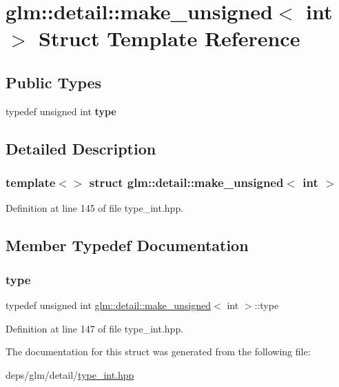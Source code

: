 \hypertarget{structglm_1_1detail_1_1make__unsigned_3_01int_01_4}{}\section{glm\+:\+:detail\+:\+:make\+\_\+unsigned$<$ int $>$ Struct Template Reference}
\label{structglm_1_1detail_1_1make__unsigned_3_01int_01_4}
\subsection*{Public Types}
\begin{DoxyCompactItemize}
\item 
\mbox{\label{structglm_1_1detail_1_1make__unsigned_3_01int_01_4_ac3fd57ed35c0305bbe941009a84139c1}} 
typedef unsigned int {\bfseries type}
\end{DoxyCompactItemize}


\subsection{Detailed Description}
\subsubsection*{template$<$$>$\newline
struct glm\+::detail\+::make\+\_\+unsigned$<$ int $>$}



Definition at line 145 of file type\+\_\+int.\+hpp.



\subsection{Member Typedef Documentation}
\mbox{\label{structglm_1_1detail_1_1make__unsigned_3_01int_01_4_ac3fd57ed35c0305bbe941009a84139c1}} 
\subsubsection{\texorpdfstring{type}{type}}
{\footnotesize\ttfamily typedef unsigned int \hyperlink{structglm_1_1detail_1_1make__unsigned}{glm\+::detail\+::make\+\_\+unsigned}$<$ int $>$\+::type}



Definition at line 147 of file type\+\_\+int.\+hpp.



The documentation for this struct was generated from the following file\+:\begin{DoxyCompactItemize}
\item 
deps/glm/detail/\hyperlink{type__int_8hpp}{type\+\_\+int.\+hpp}\end{DoxyCompactItemize}
